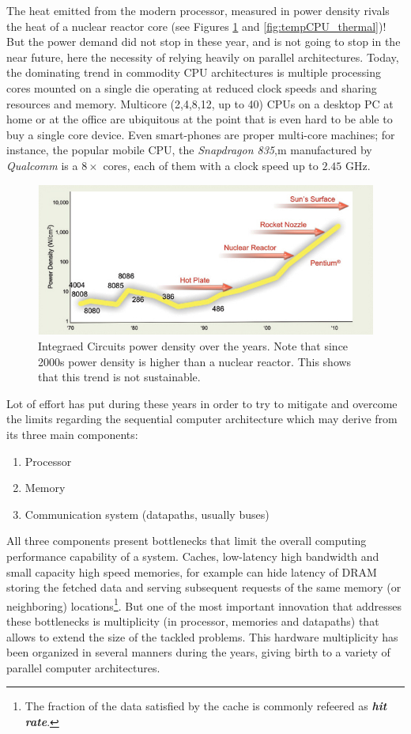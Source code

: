 The heat emitted from the modern processor, measured in power density rivals the heat of a nuclear reactor core (see Figures \ref{fig:tempCPU} and \ref{fig:tempCPU_thermal})!
But the power demand did not stop in these year, and is not going to stop in the near future, here the necessity of relying heavily on parallel architectures. Today, the dominating trend in commodity CPU architectures is multiple processing cores mounted on a single die operating at reduced clock speeds and sharing resources and memory. Multicore (2,4,8,12, up to 40) CPUs on a desktop PC at home or at the office are ubiquitous at the point that is even hard to be able to buy a single core device.
Even smart-phones are proper multi-core machines; for instance, the popular mobile CPU, the \textit{Snapdragon 835},m manufactured by \textit{Qualcomm} is a $8 \times$ cores, each of them with a clock speed up to $2.45$ \si{GHz}.
\begin{figure}[!htbp]
\centering
\includegraphics[width=1.0\textwidth]{./images/parallel_programming/temperatureCPU}
\caption[Temperature density of CPUs over the years.]{Integraed Circuits power density over the years. Note  that since 2000s power density is higher than a nuclear reactor. This shows that this trend is not sustainable.}\label{fig:tempCPU}
\end{figure}

Lot of effort has put during these years in order to try to mitigate and overcome the limits regarding the sequential computer architecture which may derive from its three main components:
\begin{enumerate}
\item  Processor
\item Memory
\item  Communication system (datapaths, usually buses)
\end{enumerate}
All three components present bottlenecks that limit the overall computing performance capability of a system. Caches, low-latency high bandwidth and small capacity high speed memories, for example can hide latency of DRAM storing the fetched data and serving subsequent requests of the same memory (or neighboring) locations\footnote{The fraction of the data satisfied by the cache is commonly refeered as \textit{\textbf{hit rate}}.}. But one of the most important innovation that addresses these bottlenecks is multiplicity (in processor, memories and datapaths) that allows to extend the size of the tackled problems. This hardware multiplicity has been organized in several manners during the years, giving birth to a variety of parallel computer architectures.

